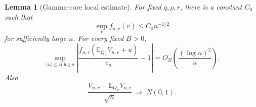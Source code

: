 \documentclass[11pt,oneside]{article}
\numberwithin{equation}{section}
\theoremstyle{plain}
\newtheorem{lemma}[theorem]{Lemma}
\theoremstyle{definition}
\theoremstyle{remark}
\newcommand{\E}{\mathbb E}
\begin{document}
\begin{lemma}[Gamma-core local estimate]\label{lem:local}
For fixed $q,\rho,r$, there is a constant $C_0$ such that
\begin{equation}\label{eq:globalsup}
 \sup_v f_{n,r}(v)\le C_0 n^{-1/2}
\end{equation}
for sufficiently large $n$. For every fixed $B>0$,
\begin{equation}\label{eq:localdensity}
 \sup_{|u|\le B\log n}
 \left|\frac{f_{n,r}(\E_{Q_n}V_{n,r}+u)}{c_n}-1\right|
   =O_B\!\left(\frac{(\log n)^2}{n}\right).
\end{equation}
Also
\begin{equation}\label{eq:CLT}
 \frac{V_{n,r}-\E_{Q_n}V_{n,r}}{\sqrt n}
   \ \Rightarrow\ N(0,1).
\end{equation}
\end{lemma}
\end{document}
